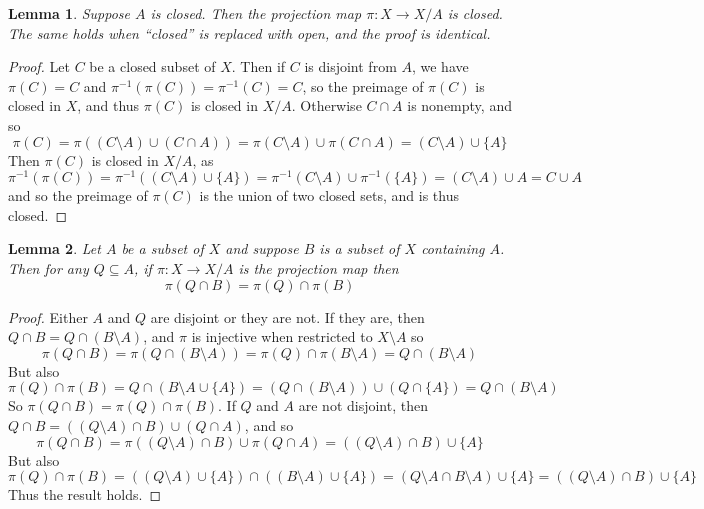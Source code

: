 \documentclass[12pt]{article}
\newtheorem{lemma}{Lemma}
\begin{document}
\begin{lemma}
  Suppose $A$ is closed. Then the projection map $\pi : X \to X/A$ is closed. The same holds when ``closed'' is replaced with open, and the proof is identical.
\end{lemma}
\begin{proof}
  Let $C$ be a closed subset of $X$. Then if $C$ is disjoint from $A$, we have $\pi(C) = C$ and $\pi^{-1}(\pi(C)) = \pi^{-1}(C) = C$, so the preimage of $\pi(C)$ is closed in $X$, and thus $\pi(C)$ is closed in $X/A$. Otherwise $C\cap A$ is nonempty, and so
  $$\pi(C) = \pi((C \setminus A) \cup (C \cap A)) = \pi(C \setminus A) \cup \pi(C \cap A) = (C\setminus A) \cup \{A\}$$
  Then $\pi(C)$ is closed in $X/A$, as
  $$\pi^{-1}(\pi(C)) = \pi^{-1}((C\setminus A) \cup \{A\}) = \pi^{-1}(C\setminus A) \cup \pi^{-1}(\{A\}) = (C\setminus A) \cup A = C \cup A$$
  and so the preimage of $\pi(C)$ is the union of two closed sets, and is thus closed.
\end{proof}

\begin{lemma}
  Let $A$ be a subset of $X$ and suppose $B$ is a subset of $X$ containing $A$. Then for any $Q \subseteq A$, if $\pi :  X \to X/A$ is the projection map then
  $$\pi(Q \cap B) = \pi(Q) \cap \pi(B)$$
\end{lemma}
\begin{proof}
  Either $A$ and $Q$ are disjoint or they are not. If they are, then $Q \cap B = Q \cap (B\setminus A)$, and $\pi$ is injective when restricted to $X \setminus A$ so
  $$\pi(Q \cap B) = \pi(Q \cap (B\setminus A)) = \pi(Q) \cap \pi(B \setminus A) = Q \cap (B \setminus A)$$
  But also
  $$\pi(Q) \cap \pi(B) = Q \cap (B \setminus A \cup \{A\}) = (Q \cap (B \setminus A)) \cup (Q \cap \{A\}) = Q \cap (B \setminus A)$$
  So $\pi(Q \cap B) = \pi(Q) \cap \pi(B)$.
  If $Q$ and $A$ are not disjoint, then $Q \cap B = ((Q \setminus A) \cap B) \cup (Q \cap A)$, and so
  $$\pi(Q \cap B) = \pi((Q \setminus A) \cap B) \cup \pi(Q \cap A) = ((Q \setminus A) \cap B) \cup \{A\}$$
  But also
  $$\pi(Q) \cap \pi(B) = ((Q \setminus A) \cup \{A\}) \cap ((B \setminus A) \cup \{A\}) = (Q \setminus A \cap B \setminus A) \cup \{A\} = ((Q \setminus A) \cap B) \cup \{A\}$$
  Thus the result holds.
\end{proof}
\end{document}
